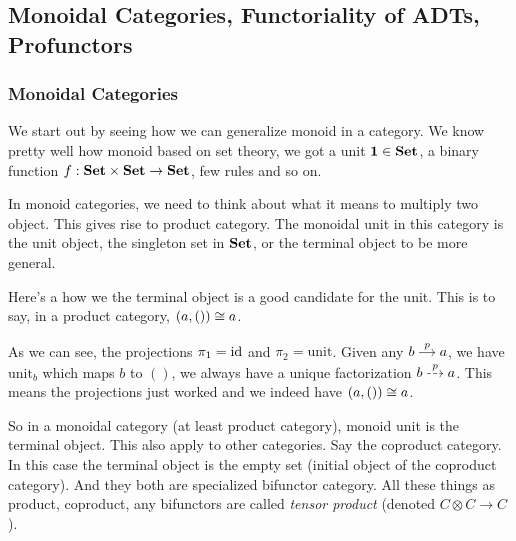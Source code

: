 \setcounter{section}{7}
\setcounter{subsection}{1}
\subsection{Monoidal Categories, Functoriality of ADTs, Profunctors}

\subsubsection{Monoidal Categories}

We start out by seeing how we can generalize monoid in a category. We know
pretty well how monoid based on set theory, we got a unit $\mathbf{1} \in \mathbf{Set}$,
a binary function $f : \mathbf{Set} \times \mathbf{Set} \to \mathbf{Set}$, few rules and so on.

In monoid categories, we need to think about what it means to multiply two
object. This gives rise to product category. The monoidal unit in this category
is the unit object, the singleton set in $\mathbf{Set}$, or the terminal object to be
more general.

Here's a how we the terminal object is a good candidate for the unit. This is to
say, in a product category, $(a, ()) \iso a$.

\begin{center}
\end{center}

As we can see, the projections $\pi_1 = \mathrm{id}$ and $\pi_2 = \mathrm{unit}$. Given
any $\cd{b \rar{p} \& a}$, we have $\mathrm{unit}_b$ which maps $b$ to $()$, we
always have a unique factorization $\cd{b \ar[dashed]{r}{p} \& a}$. This means
the projections just worked and we indeed have $(a, ()) \iso a$.

So in a monoidal category (at least product category), monoid unit is the
terminal object. This also apply to other categories. Say the coproduct
category. In this case the terminal object is the empty set (initial object of
the coproduct category). And they both are specialized bifunctor category. All
these things as product, coproduct, any bifunctors are called \emph{tensor product}
(denoted $C \otimes C \to C$).

